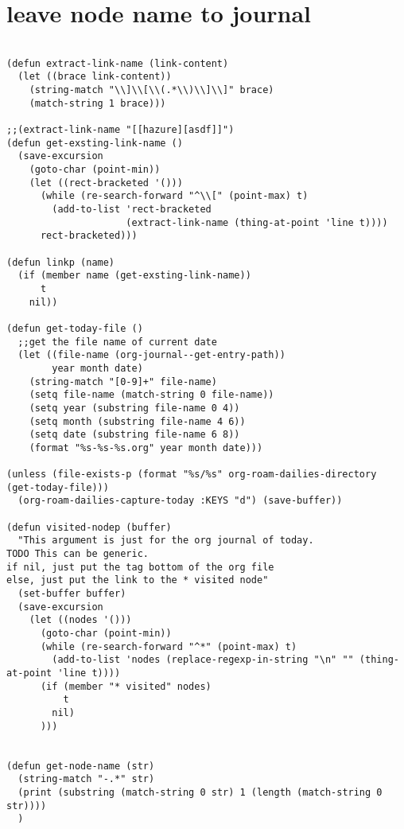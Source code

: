\documentclass[11pt]{article}
\begin{document}
\section{leave node name to journal}
\label{sec:orgda97097}
\begin{verbatim}

(defun extract-link-name (link-content)
  (let ((brace link-content))
    (string-match "\\]\\[\\(.*\\)\\]\\]" brace)
    (match-string 1 brace)))

;;(extract-link-name "[[hazure][asdf]]")
(defun get-exsting-link-name ()
  (save-excursion
    (goto-char (point-min))
    (let ((rect-bracketed '()))
      (while (re-search-forward "^\\[" (point-max) t)
        (add-to-list 'rect-bracketed
                     (extract-link-name (thing-at-point 'line t))))
      rect-bracketed)))

(defun linkp (name)
  (if (member name (get-exsting-link-name))
      t
    nil))

(defun get-today-file ()
  ;;get the file name of current date
  (let ((file-name (org-journal--get-entry-path))
        year month date)
    (string-match "[0-9]+" file-name)
    (setq file-name (match-string 0 file-name))
    (setq year (substring file-name 0 4))
    (setq month (substring file-name 4 6))
    (setq date (substring file-name 6 8))
    (format "%s-%s-%s.org" year month date)))

(unless (file-exists-p (format "%s/%s" org-roam-dailies-directory (get-today-file)))
  (org-roam-dailies-capture-today :KEYS "d") (save-buffer))

(defun visited-nodep (buffer)
  "This argument is just for the org journal of today.
TODO This can be generic.
if nil, just put the tag bottom of the org file
else, just put the link to the * visited node"
  (set-buffer buffer)
  (save-excursion
    (let ((nodes '()))
      (goto-char (point-min))
      (while (re-search-forward "^*" (point-max) t)
        (add-to-list 'nodes (replace-regexp-in-string "\n" "" (thing-at-point 'line t))))
      (if (member "* visited" nodes)
          t
        nil)
      )))


(defun get-node-name (str)
  (string-match "-.*" str)
  (print (substring (match-string 0 str) 1 (length (match-string 0 str))))
  )


\end{verbatim}
\end{document}
